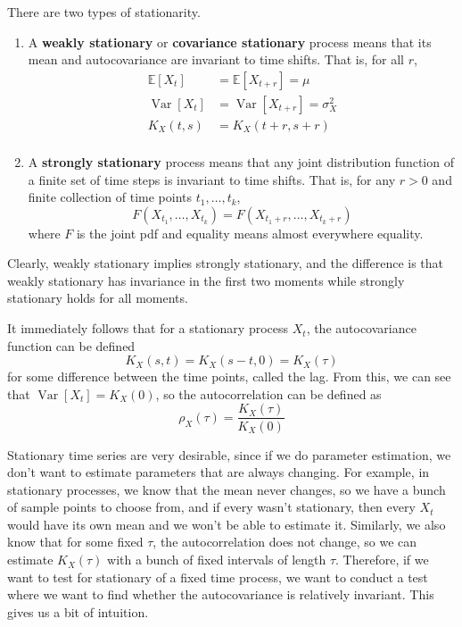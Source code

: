 \documentclass{article}
\DeclareMathOperator{\Var}{Var}
\begin{document}
  \begin{definition}[Stationarity]
    There are two types of stationarity. 
    \begin{enumerate}
      \item A \textbf{weakly stationary} or \textbf{covariance stationary} process means that its mean and autocovariance are invariant to time shifts. That is, for all $r$, 
        \begin{align}
          \mathbb{E}[X_t] & = \mathbb{E}[X_{t+r}] = \mu \\
          \Var[X_t] & = \Var[X_{t+r}] = \sigma_X^2 \\
          K_X (t, s) & = K_X (t + r, s + r) \\
        \end{align}

      \item A \textbf{strongly stationary} process means that any joint distribution function of a finite set of time steps is invariant to time shifts. That is, for any $r > 0$ and  finite collection of time points $t_1, \ldots, t_k$, 
        \begin{equation}
          F(X_{t_1}, \ldots, X_{t_k}) = F(X_{t_1 + r}, \ldots, X_{t_k + r})
        \end{equation}
        where $F$ is the joint pdf and equality means almost everywhere equality. 
    \end{enumerate}
    Clearly, weakly stationary implies strongly stationary, and the difference is that weakly stationary has invariance in the first two moments while strongly stationary holds for all moments. 
  \end{definition}

  \begin{theorem}
    It immediately follows that for a stationary process $X_t$, the autocovariance function can be defined 
    \begin{equation}
      K_X (s, t) = K_X(s - t, 0) = K_X (\tau)
    \end{equation}
    for some difference between the time points, called the lag. From this, we can see that $\Var[X_t] = K_X (0)$, so the autocorrelation can be defined as 
    \begin{equation}
      \rho_X(\tau) = \frac{K_X (\tau)}{K_X (0)}
    \end{equation}
  \end{theorem}

  Stationary time series are very desirable, since if we do parameter estimation, we don't want to estimate parameters that are always changing. For example, in stationary processes, we know that the mean never changes, so we have a bunch of sample points to choose from, and if every wasn't stationary, then every $X_t$ would have its own mean and we won't be able to estimate it. Similarly, we also know that for some fixed $\tau$, the autocorrelation does not change, so we can estimate $K_X (\tau)$ with a bunch of fixed intervals of length $\tau$. Therefore, if we want to test for stationary of a fixed time process, we want to conduct a test where we want to find whether the autocovariance is relatively invariant. This gives us a bit of intuition. 
\end{document}
